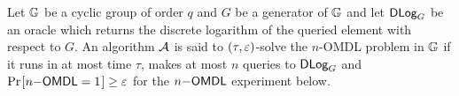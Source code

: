 \documentclass[runningheads]{llncs}
\begin{document}
\begin{definition}
  Let $\mathbb{G}$ be a cyclic group of order $q$ and $G$ be a generator of $\mathbb{G}$ and let $\textsf{DLog}_G$ be an oracle which returns the discrete logarithm of the queried element with respect to $G$.
  An algorithm $\mathcal{A}$ is said to $(\tau, \varepsilon)$-solve the $n$-OMDL problem in $\mathbb{G}$ if it runs in at most time $\tau$, makes at most $n$ queries to $\textsf{DLog}_G$ and $\prob{\OMDL = 1} \geq \e$ for the $n\mathsf{-OMDL}$ experiment below.
  \begin{center}
  \end{center}
\end{definition}


\newcommand{\CR}{\mathsf{cr}}
\end{document}
